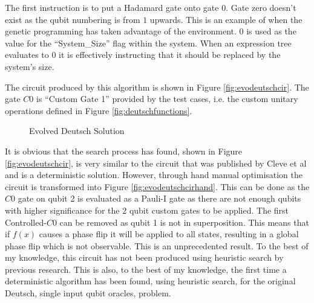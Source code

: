 The first instruction is to put a Hadamard gate onto gate $0$.
Gate zero doesn't exist as the qubit numbering is from $1$ upwards.
This is an example of when the genetic programming has taken advantage of the environment.
$0$ is used as the value for the ``System\_Size'' flag within the system.
When an expression tree evaluates to $0$ it is effectively instructing that it should be replaced by the system's size.

The circuit produced by this algorithm is shown in Figure \ref{fig:evodeutschcir}.
The gate $C0$ is ``Custom Gate 1'' provided by the test cases, i.e. the custom unitary operations defined in Figure \ref{fig:deutschfunctions}.

\begin{figure}
\centering
{}
\caption{Evolved Deutsch Solution}
\end{figure}

It is obvious that the search process has found, shown in Figure \ref{fig:evodeutschcir}, is very similar to the circuit that was published by Cleve et al\cite{Cleve98quantumalgorithms} and is a deterministic solution.
However, through hand manual optimisation the circuit is transformed into Figure \ref{fig:evodeutschcirhand}.
This can be done as the $C0$ gate on qubit 2 is evaluated as a Pauli-I gate as there are not enough qubits with higher significance for the 2 qubit custom gates to be applied.
The first Controlled-$C0$ can be removed as qubit 1 is not in superposition.
This means that if $f(x)$ causes a phase flip it will be applied to all states, resulting in a global phase flip which is not observable.
This is an unprecedented result.
To the best of my knowledge, this circuit has not been produced using heuristic search by previous research.
This is also, to the best of my knowledge, the first time a deterministic algorithm has been found, using heuristic search, for the original Deutsch, single input qubit oracles, problem.


